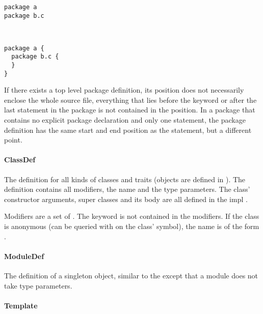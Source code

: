 \begin{multicols}{2}
\begin{lstlisting}
package a
package b.c
  
  
\end{lstlisting}

\begin{lstlisting}
package a {
  package b.c {
  }
}
\end{lstlisting}
\end{multicols}


If there exists a top level package definition, its position does not necessarily enclose the whole source file, everything that lies before the  keyword or after the last statement in the package is not contained in the position. In a package that contains no explicit package declaration and only one statement, the package definition has the same start and end position as the statement, but a different point.

\paragraph{ClassDef} 

\noindent The definition for all kinds of classes and traits (objects are defined in ). The definition contains all modifiers, the name and the type parameters. The class' constructor arguments, super classes and its body are all defined in the impl .

Modifiers are a set of . The  keyword is not contained in the modifiers. If the class is anonymous (can be queried with  on the class' symbol), the name is of the form .

\paragraph{ModuleDef} 

\noindent The definition of a singleton object, similar to the  except that a module does not take type parameters.

\paragraph{Template} 

